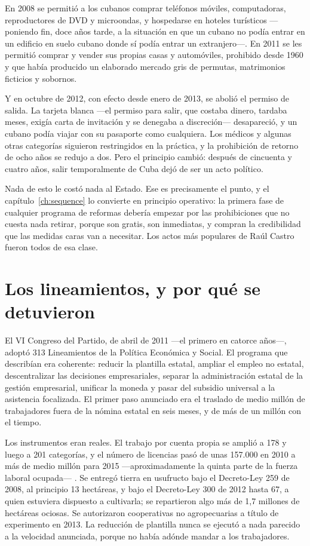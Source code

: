 En 2008 se permitió a los cubanos comprar teléfonos móviles, computadoras,
reproductores de DVD y microondas, y hospedarse en hoteles turísticos ---poniendo
fin, doce años tarde, a la situación en que un cubano no podía entrar en un
edificio en suelo cubano donde sí podía entrar un extranjero---. En 2011 se les
permitió comprar y vender sus propias casas y automóviles, prohibido desde 1960 y
que había producido un elaborado mercado gris de permutas, matrimonios ficticios y
sobornos.

Y en octubre de 2012, con efecto desde enero de 2013, se abolió el permiso de
salida. La tarjeta blanca ---el permiso para salir, que costaba dinero, tardaba
meses, exigía carta de invitación y se denegaba a discreción--- desapareció, y un
cubano podía viajar con su pasaporte como cualquiera. Los médicos y algunas otras
categorías siguieron restringidos en la práctica, y la prohibición de retorno de
ocho años se redujo a dos. Pero el principio cambió: después de cincuenta y cuatro
años, salir temporalmente de Cuba dejó de ser un acto político.

Nada de esto le costó nada al Estado. Ese es precisamente el punto, y el
capítulo~\ref{ch:sequence} lo convierte en principio operativo: la primera fase de
cualquier programa de reformas debería empezar por las prohibiciones que no cuesta
nada retirar, porque son gratis, son inmediatas, y compran la credibilidad que las
medidas caras van a necesitar. Los actos más populares de Raúl Castro fueron todos
de esa clase.

\section{Los lineamientos, y por qué se detuvieron}

El VI Congreso del Partido, de abril de 2011 ---el primero en catorce años---,
adoptó 313 Lineamientos de la Política Económica y Social. El programa que
describían era coherente: reducir la plantilla estatal, ampliar el empleo no
estatal, descentralizar las decisiones empresariales, separar la administración
estatal de la gestión empresarial, unificar la moneda y pasar del subsidio
universal a la asistencia focalizada. El primer paso anunciado era el traslado de
medio millón de trabajadores fuera de la nómina estatal en seis meses, y de más de
un millón con el tiempo.

Los instrumentos eran reales. El trabajo por cuenta propia se amplió a 178 y luego
a 201 categorías, y el número de licencias pasó de unas 157.000 en 2010 a más de
medio millón para 2015 ---aproximadamente la quinta parte de la fuerza laboral
ocupada--- \citep{ritter2015}.\unv{} Se entregó tierra en usufructo bajo el
Decreto-Ley 259 de 2008, al principio 13 hectáreas, y bajo el Decreto-Ley 300 de
2012 hasta 67, a quien estuviera dispuesto a cultivarla; se repartieron algo más
de 1,7 millones de hectáreas ociosas.\unv{} Se autorizaron cooperativas no
agropecuarias a título de experimento en 2013. La reducción de plantilla nunca se
ejecutó a nada parecido a la velocidad anunciada, porque no había adónde mandar a
los trabajadores.

